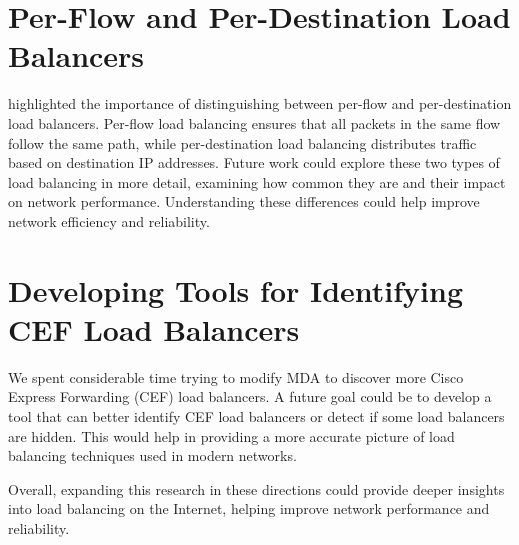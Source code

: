 \documentclass[12pt]{cwru_thesis}
\begin{document}
\section*{Per-Flow and Per-Destination Load Balancers}

\textbf{\cite{4261334}} highlighted the importance of distinguishing between per-flow and per-destination load balancers. Per-flow load balancing ensures that all packets in the same flow follow the same path, while per-destination load balancing distributes traffic based on destination IP addresses. Future work could explore these two types of load balancing in more detail, examining how common they are and their impact on network performance. Understanding these differences could help improve network efficiency and reliability.

\section*{Developing Tools for Identifying CEF Load Balancers}

We spent considerable time trying to modify MDA to discover more Cisco Express Forwarding (CEF) load balancers. A future goal could be to develop a tool that can better identify CEF load balancers or detect if some load balancers are hidden. This would help in providing a more accurate picture of load balancing techniques used in modern networks.

Overall, expanding this research in these directions could provide deeper insights into load balancing on the Internet, helping improve network performance and reliability.



\printbibliography[heading=bibintoc]
\end{document}
